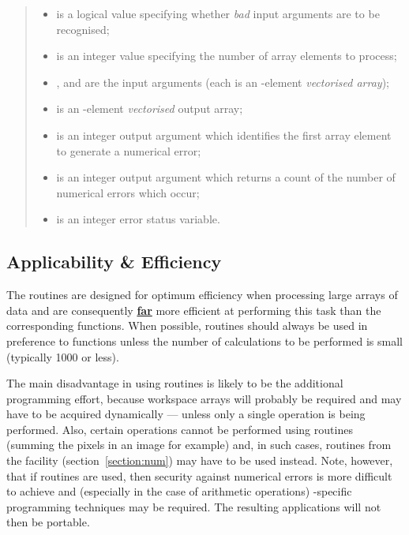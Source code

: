 \begin{quote}
\begin{itemize}

\item {} is a logical value specifying whether {\em bad}
input arguments are to be recognised;

\item {} is an integer value specifying the number of array
elements to process;

\item {},  and  are the input
arguments (each is an -element {\em vectorised array});

\item {} is an -element {\em vectorised} output
array;

\item {} is an integer output argument which identifies the
first array element to generate a numerical error;

\item {} is an integer output argument which returns a count of the
number of numerical errors which occur;

\item {} is an integer error status variable.

\end{itemize}
\end{quote}

\subsection{Applicability \& Efficiency}

The  routines are designed for optimum efficiency when
processing large arrays of data and are consequently {\bf \underline{far}}
more efficient at performing this task than the corresponding 
functions.
When possible,  routines should always be used in preference to
 functions unless the number of calculations to be performed is
small (typically 1000 or less).

The main disadvantage in using  routines is likely to be the
additional programming effort, because workspace arrays will probably be
required and may have to be acquired dynamically --- unless only a single
operation is being performed.
Also, certain operations cannot be performed using  routines
(summing the pixels in an image for example) and, in such cases,
routines from the  facility (section~\ref{section:num}) may have
to be used instead.
Note, however, that if  routines are used, then security against
numerical errors is more difficult to achieve and (especially in the case of
arithmetic operations) -specific programming techniques may be
required.
The resulting applications will not then be portable.

